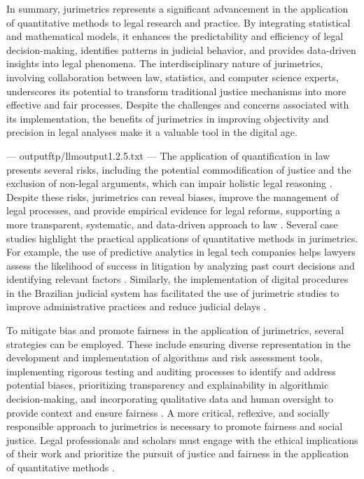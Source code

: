 In summary, jurimetrics represents a significant advancement in the application of quantitative methods to legal research and practice. By integrating statistical and mathematical models, it enhances the predictability and efficiency of legal decision-making, identifies patterns in judicial behavior, and provides data-driven insights into legal phenomena. The interdisciplinary nature of jurimetrics, involving collaboration between law, statistics, and computer science experts, underscores its potential to transform traditional justice mechanisms into more effective and fair processes. Despite the challenges and concerns associated with its implementation, the benefits of jurimetrics in improving objectivity and precision in legal analyses make it a valuable tool in the digital age.


---
outputftp/llmoutput1.2.5.txt
---
The application of quantification in law presents several risks, including the potential commodification of justice and the exclusion of non-legal arguments, which can impair holistic legal reasoning \cite{nunes2018, ribeiro1998}. Despite these risks, jurimetrics can reveal biases, improve the management of legal processes, and provide empirical evidence for legal reforms, supporting a more transparent, systematic, and data-driven approach to law \cite{ribeiro2021, nunes2018, silva2023}. Several case studies highlight the practical applications of quantitative methods in jurimetrics. For example, the use of predictive analytics in legal tech companies helps lawyers assess the likelihood of success in litigation by analyzing past court decisions and identifying relevant factors \cite{ribeiro2021quantification}. Similarly, the implementation of digital procedures in the Brazilian judicial system has facilitated the use of jurimetric studies to improve administrative practices and reduce judicial delays \cite{103390fi9040068}.

To mitigate bias and promote fairness in the application of jurimetrics, several strategies can be employed. These include ensuring diverse representation in the development and implementation of algorithms and risk assessment tools, implementing rigorous testing and auditing processes to identify and address potential biases, prioritizing transparency and explainability in algorithmic decision-making, and incorporating qualitative data and human oversight to provide context and ensure fairness \cite{10.1590/dados.2022.65.3.267,10.1057/s41599-020-0396-5}. A more critical, reflexive, and socially responsible approach to jurimetrics is necessary to promote fairness and social justice. Legal professionals and scholars must engage with the ethical implications of their work and prioritize the pursuit of justice and fairness in the application of quantitative methods \cite{10.1590/dados.2022.65.3.267,10.1057/s41599-020-0396-5}.

